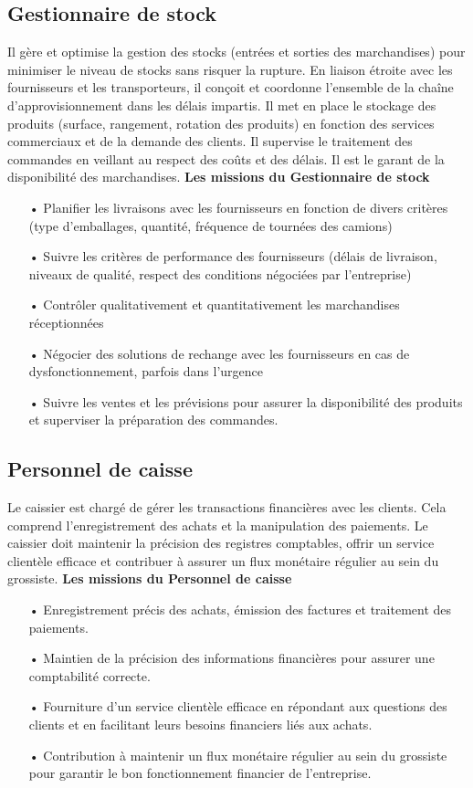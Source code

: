 \documentclass[edit,12pt,a4paper,ChapStyle,oneside,doubleinterligne]{report}
\begin{document}
\subsection{Gestionnaire de stock}
Il gère et optimise la gestion des stocks (entrées et sorties des marchandises) pour minimiser le niveau de stocks sans risquer la rupture. En liaison étroite avec les fournisseurs et les transporteurs, il conçoit et coordonne l'ensemble de la chaîne d'approvisionnement dans les délais impartis. Il met en place le stockage des produits (surface, rangement, rotation des produits) en fonction des services commerciaux et de la demande des clients. Il supervise le traitement des commandes en veillant au respect des coûts et des délais. Il est le garant de la disponibilité des marchandises\cite{Gestionnaire}.
\newline\textbf{Les missions du Gestionnaire de stock}\newline
\begin{itemize}
    \item [•] Planifier les livraisons avec les fournisseurs en fonction de divers critères (type d'emballages, quantité, fréquence de tournées des camions)
    \item [•]	Suivre les critères de performance des fournisseurs (délais de livraison, niveaux de qualité, respect des conditions négociées par l'entreprise)
    \item [•]   Contrôler qualitativement et quantitativement les marchandises réceptionnées
    \item [•]   Négocier des solutions de rechange avec les fournisseurs en cas de dysfonctionnement, parfois dans l'urgence
    \item [•]   Suivre les ventes et les prévisions pour assurer la disponibilité des produits et superviser la préparation des commandes.
\end{itemize}
\subsection{Personnel de caisse }
Le caissier est chargé de gérer les transactions financières avec les clients. Cela comprend l'enregistrement des achats et la manipulation des paiements. Le caissier doit maintenir la précision des registres comptables, offrir un service clientèle efficace et contribuer à assurer un flux monétaire régulier au sein du grossiste\cite{Personnel}.
\newline\textbf{Les missions du Personnel de caisse}\newline
\begin{itemize}
    \item [•] Enregistrement précis des achats, émission des factures et traitement des paiements.
    \item [•] Maintien de la précision des informations financières pour assurer une comptabilité correcte.
    \item [•] Fourniture d'un service clientèle efficace en répondant aux questions des clients et en facilitant leurs besoins financiers liés aux achats.
    \item [•] Contribution à maintenir un flux monétaire régulier au sein du grossiste pour garantir le bon fonctionnement financier de l'entreprise.
\end{itemize}
\end{document}
